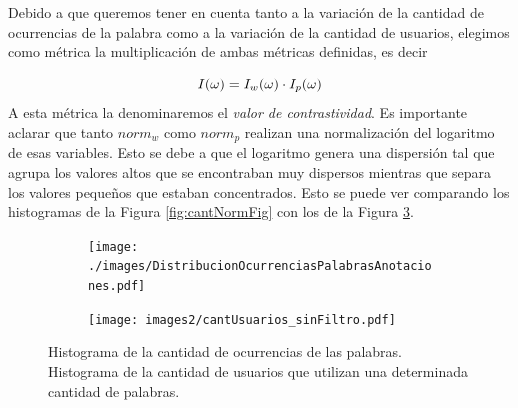 
Debido a que queremos tener en cuenta tanto a la variación de la cantidad de ocurrencias de la palabra como a la variación de la cantidad de usuarios, elegimos como métrica la multiplicación de ambas métricas definidas, es decir  

\begin{equation}
I(\omega) =  I_w (\omega) \cdot I_p(\omega)\\
\label{eq:ivalor}
\end{equation}
A esta métrica la denominaremos el \textit{valor de contrastividad}.
Es importante aclarar que tanto $norm_{w}$ como $norm_p$ realizan una normalización del logaritmo de esas variables. Esto se debe a que el logaritmo genera una dispersión tal que agrupa los valores altos que se encontraban muy dispersos mientras que separa los valores pequeños que estaban concentrados. Esto se puede ver comparando los histogramas de la Figura \ref{fig:cantNormFig} con los de la Figura \ref{fig:cantPalabrasSinNorm}.




\begin{figure}[!ht]\centering
  \begin{subfigure}[t]{0.49\textwidth}
    \texttt{[image: ./images/DistribucionOcurrenciasPalabrasAnotaciones.pdf]}
    \caption{}
    \label{fig:cantPalabrasAnotaciones} 
   \end{subfigure}
   \begin{subfigure}[t]{0.49\textwidth}
    \texttt{[image: images2/cantUsuarios\_sinFiltro.pdf]}
    \caption{}
    \label{fig:cantUsuarios} 
   \end{subfigure}
   \caption{ Histograma de la cantidad de ocurrencias de las palabras.  Histograma de la cantidad de usuarios que utilizan una determinada cantidad de palabras.} 
   \label{fig:cantPalabrasSinNorm} 
\end{figure}

